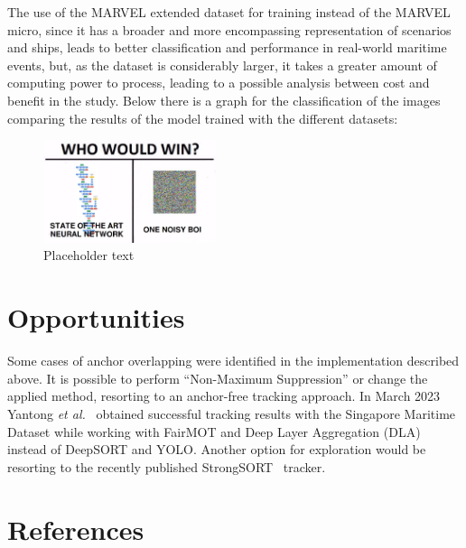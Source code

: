 \documentclass[a4paper,12pt]{article}
\begin{document}
\begin{multicols}{2}

The use of the MARVEL extended dataset for training instead of the MARVEL micro, since it has a broader and more encompassing representation of scenarios and ships, leads to better classification and performance in real-world maritime events, but, as the dataset is considerably larger, it takes a greater amount of computing power to process, leading to a possible analysis between cost and benefit in the study. Below there is a graph for the classification of the images comparing the results of the model trained with the different datasets:

\begin{figure}[H]
    \centering
    \includegraphics[width=0.45\textwidth]{placeholder}
    \caption{Placeholder text}
    \label{fig:3}
\end{figure}

\section{Opportunities}\label{sec:opportunities}
Some cases of anchor overlapping were identified in the implementation described above.
It is possible to perform ``Non-Maximum Suppression'' or change the applied method, resorting to an anchor-free tracking approach.
In March 2023 Yantong \textit{et al.}~\cite{FAIRMOT} obtained successful tracking results with the Singapore Maritime Dataset while working with FairMOT and Deep Layer Aggregation (DLA) instead of DeepSORT and YOLO\@.
Another option for exploration would be resorting to the recently published StrongSORT~\cite{STRONGSORT} tracker.

\section{References}\label{sec:references}
\printbibliography
\end{multicols}
\end{document}
